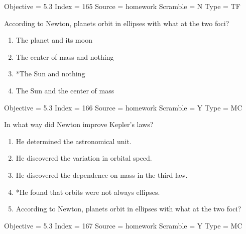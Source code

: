 \documentclass[11pt]{article}
\begin{document}
\begin{enumerate}
\begin{minipage}{\textwidth}
\begin{minipage}{\textwidth}
Objective = 5.3
Index = 165
Source = homework
Scramble = N
Type = TF
\end{minipage}
\end{minipage}
\vskip 0.20in

\begin{minipage}{\textwidth}
\begin{minipage}{\textwidth}
\item According to Newton, planets orbit in ellipses with what at the two foci?
\begin{multicols}{2}
\begin{enumerate} 
\setlength{\itemsep}{1pt} 
\setlength{\parskip}{0pt} 
\setlength{\parsep}{0pt}
\setlength{\multicolsep}{1pt} 
\item The planet and its moon
\item The center of mass and nothing
\item *The Sun and nothing
\item The Sun and the center of mass
\end{enumerate} 
\vfill 
\end{multicols}

Objective = 5.3
Index = 166
Source = homework
Scramble = Y
Type = MC
\end{minipage}
\end{minipage}
\vskip 0.20in

\begin{minipage}{\textwidth}
\begin{minipage}{\textwidth}
\item In what way did Newton improve Kepler's laws?
\begin{enumerate} 
\setlength{\itemsep}{1pt} 
\setlength{\parskip}{0pt} 
\setlength{\parsep}{0pt}
\setlength{\multicolsep}{1pt} 
\item He determined the astronomical unit.
\item He discovered the variation in orbital speed.
\item He discovered the dependence on mass in the third law.
\item *He found that orbits were not always ellipses.
\item According to Newton, planets orbit in ellipses with what at the two foci?
\end{enumerate} 
Objective = 5.3
Index = 167
Source = homework
Scramble = Y
Type = MC
\end{minipage}
\end{minipage}
\vskip 0.20in


\end{enumerate}
\end{document}
